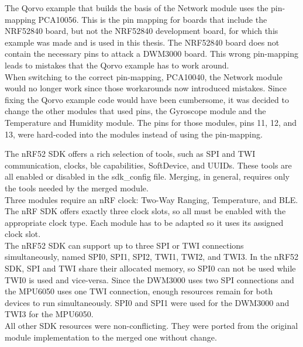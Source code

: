 The Qorvo example that builds the basis of the Network module uses the pin-mapping PCA10056.
This is the pin mapping for boards that include the NRF52840 board, but not the NRF52840 development board, for which this example was made and is used in this thesis.
The NRF52840 board does not contain the necessary pins to attack a DWM3000 board.
This wrong pin-mapping leads to mistakes that the Qorvo example has to work around.\\
When switching to the correct pin-mapping, PCA10040, the Network module would no longer work since those workarounds now introduced mistakes.
Since fixing the Qorvo example code would have been cumbersome, it was decided to change the other modules that used pins, the Gyroscope module and the Temperature and Humidity module.
The pins for those modules, pins 11, 12, and 13, were hard-coded into the modules instead of using the pin-mapping.


The nRF52 SDK offers a rich selection of tools, such as SPI and TWI communication, clocks, ble capabilities, SoftDevice, and UUIDs.
These tools are all enabled or disabled in the sdk{\_}config file.
Merging, in general, requires only the tools needed by the merged module.\\
Three modules require an nRF clock: Two-Way Ranging, Temperature, and BLE.
The nRF SDK offers exactly three clock slots, so all must be enabled with the appropriate clock type.
Each module has to be adapted so it uses its assigned clock slot. \\
The nRF52 SDK can support up to three SPI or TWI connections simultaneously, named SPI0, SPI1, SPI2, TWI1, TWI2, and TWI3.
In the nRF52 SDK, SPI and TWI share their allocated memory, so SPI0 can not be used while TWI0 is used and vice-versa.
Since the DWM3000 uses two SPI connections and the MPU6050 uses one TWI connection, enough resources remain for both devices to run simultaneously.
SPI0 and SPI1 were used for the DWM3000 and TWI3 for the MPU6050.\\
All other SDK resources were non-conflicting.
They were ported from the original module implementation to the merged one without change.


